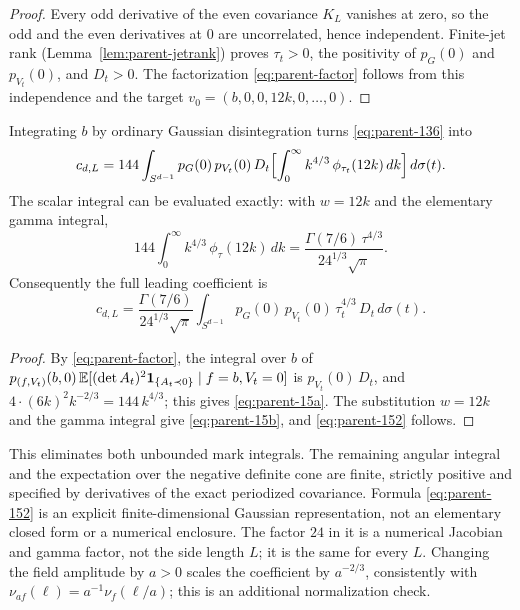 \begin{proof}
Every odd derivative of the even covariance $K_L$ vanishes at zero, so the odd and the even derivatives at $0$ are uncorrelated, hence independent. Finite-jet rank (Lemma~\ref{lem:parent-jetrank}) proves $\tau_t>0$, the positivity of $p_G(0)$ and $p_{V_t}(0)$, and $D_t>0$. The factorization \eqref{eq:parent-factor} follows from this independence and the target $v_0=(b,0,0,12k,0,\dots,0)$.
\end{proof}

\begin{proposition}\label{prop:parent-coef}
Integrating $b$ by ordinary Gaussian disintegration turns \eqref{eq:parent-136} into
\begin{equation}\label{eq:parent-15a}
c_{d,L}=144\int_{S^{d-1}}p_G(0)\,p_{V_t}(0)\,D_t\Bigl[\int_0^\infty k^{4/3}\,\phi_{\tau_t}(12k)\,dk\Bigr]\,d\sigma(t).
\end{equation}
The scalar integral can be evaluated exactly: with $w=12k$ and the elementary gamma integral,
\begin{equation}\label{eq:parent-15b}
144\int_0^\infty k^{4/3}\,\phi_\tau(12k)\,dk=\frac{\Gamma(7/6)\,\tau^{4/3}}{24^{1/3}\sqrt\pi}.
\end{equation}
Consequently the full leading coefficient is
\begin{equation}\label{eq:parent-152}
c_{d,L}=\frac{\Gamma(7/6)}{24^{1/3}\sqrt\pi}\int_{S^{d-1}}p_G(0)\,p_{V_t}(0)\,\tau_t^{4/3}\,D_t\,d\sigma(t).
\end{equation}
\end{proposition}

\begin{proof}
By \eqref{eq:parent-factor}, the integral over $b$ of $p_{(f,V_t)}(b,0)\,\mathbb E[(\det A_t)^2\mathbf 1_{\{A_t\prec0\}}\mid f=b,V_t=0]$ is $p_{V_t}(0)\,D_t$, and $4\cdot(6k)^2k^{-2/3}=144\,k^{4/3}$; this gives \eqref{eq:parent-15a}. The substitution $w=12k$ and the gamma integral give \eqref{eq:parent-15b}, and \eqref{eq:parent-152} follows.
\end{proof}

This eliminates both unbounded mark integrals. The remaining angular integral and the expectation over the negative definite cone are finite, strictly positive and specified by derivatives of the exact periodized covariance. Formula \eqref{eq:parent-152} is an explicit finite-dimensional Gaussian representation, not an elementary closed form or a numerical enclosure. The factor $24$ in it is a numerical Jacobian and gamma factor, not the side length $L$; it is the same for every $L$. Changing the field amplitude by $a>0$ scales the coefficient by $a^{-2/3}$, consistently with $\nu_{af}(\ell)=a^{-1}\nu_f(\ell/a)$; this is an additional normalization check.

